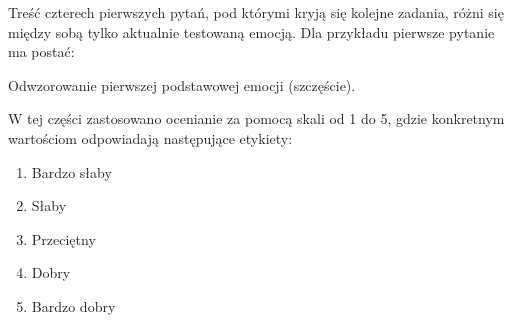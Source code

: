 Treść czterech pierwszych pytań, pod którymi kryją się kolejne zadania, różni się między sobą tylko aktualnie testowaną emocją. Dla przykładu pierwsze pytanie ma postać:
\begin{center}
    Odwzorowanie pierwszej podstawowej emocji (szczęście).
\end{center}

W tej części zastosowano ocenianie za pomocą skali od 1 do 5, gdzie konkretnym wartościom odpowiadają następujące etykiety:
\begin{enumerate}
    \item Bardzo słaby
    \item Słaby
    \item Przeciętny
    \item Dobry
    \item Bardzo dobry

\end{enumerate}

